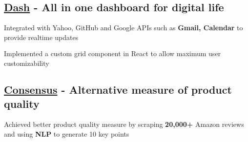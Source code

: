 

\subsection{\href{https://devpost.com/software/dash-um2zil}{Dash} - All in one dashboard for digital life}
\begin{zitemize}
    \item Integrated with Yahoo, GitHub and Google APIs such as \textbf{Gmail, Calendar} to provide realtime updates
    \item Implemented a custom grid component in React to allow maximum user customizability
\end{zitemize}

\vspace{0.3cm}\subsection{\href{https://devpost.com/software/consensus-qlc9n6}{Consensus} - Alternative measure of product quality}
\begin{zitemize}
    \item Achieved better product quality measure by scraping \textbf{20,000+} Amazon reviews and using \textbf{NLP} to generate 10 key points
\end{zitemize}
